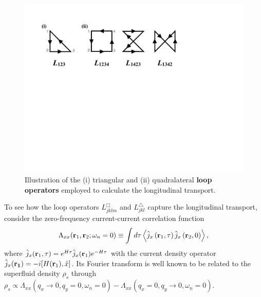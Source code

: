 \documentclass[amsmath,amssymb, aps, prx, longbibliography, twocolumn]{revtex4-1}
\begin{document}
\begin{figure}[b]
\includegraphics[scale=0.48]{LoopOperators.pdf}
\caption{
 Illustration of the (i) triangular and (ii) quadralateral {\bf loop operators} employed to calculate the longitudinal transport. 
}\label{fig:loops}
\end{figure}
To see how the loop operators $L^\Box_{jklm}$ and $ L^\triangle_{jkl}$ capture the longitudinal transport, consider the zero-frequency current-current correlation function  
\begin{equation}
\Lambda_{xx}({\bf r}_1,{\bf r}_2;\omega_n=0)\equiv\int d\tau\left\langle \hat{j}_x\left({\bf r}_1, \tau \right) \hat{j}_x\left({\bf r}_2, 0 \right)\right\rangle,
\label{eq:Lambda}
\end{equation}
where $\hat{j}_x({\bf r}_1,\tau)=e^{H\tau} \hat{j}_x({\bf r}_1) e^{-H\tau}$ with the current density operator $\hat{j}_x({\bf r_1})= -i[H({\bf r}_1),\hat{x}]$. 
Its Fourier transform %
is well known to be related \cite{Scalapino1993, Scalapino1992} to the superfluid density $\rho_s$ through $\rho_s\propto \Lambda_{xx}(q_x\!\rightarrow\! 0,q_y\!=\!0,\omega_n\!=\!0)-\Lambda_{xx}(q_x\!=\!0,q_y\!\rightarrow\!0,\omega_n\!=\!0)$. 
\end{document}
